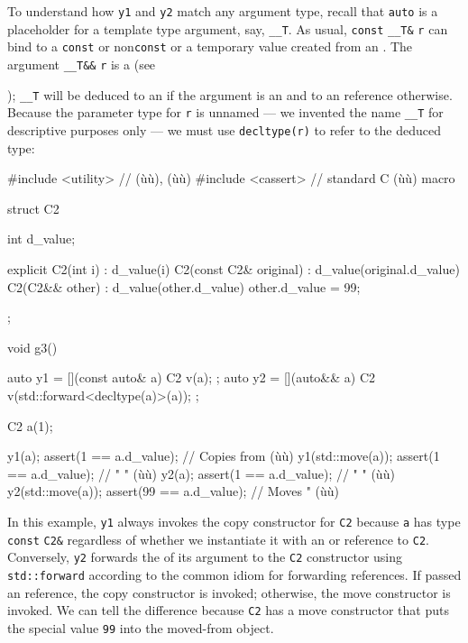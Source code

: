 \noindent To understand how \lstinline!y1! and \lstinline!y2! match any argument type,
recall that \lstinline!auto! is a placeholder for a template type argument,
say, \lstinline!__T!. As usual, \lstinline!const! \lstinline!__T&!
\lstinline!r! can bind to a \lstinline!const! or non\lstinline!const!
 or a temporary value created from an . The
argument \lstinline!__T&&! \lstinline!r! is a  (see {); \lstinline!__T! will be
deduced to an  if the argument is an  and to
an  reference otherwise. Because the parameter type for
\lstinline!r! is unnamed --- we invented the name \lstinline!__T! for
descriptive purposes only --- we must use \lstinline!decltype(r)! to refer
to the deduced type:

\begin{emcppslisting}
#include <utility>  // (ù{}ù), (ù{}ù)
#include <cassert>  // standard C (ù{}ù) macro

struct C2
{
    int d_value;

    explicit C2(int i)     : d_value(i)                { }
    C2(const C2& original) : d_value(original.d_value) { }
    C2(C2&& other)         : d_value(other.d_value)    { other.d_value = 99; }
};

void g3()
{
    auto y1 = [](const auto& a) { C2 v(a); };
    auto y2 = [](auto&&      a) { C2 v(std::forward<decltype(a)>(a)); };

    C2 a(1);

    y1(a);            assert(1  == a.d_value);  // Copies from (ù{}ù)
    y1(std::move(a)); assert(1  == a.d_value);  //    "     "  (ù{}ù)
    y2(a);            assert(1  == a.d_value);  //    "     "  (ù{}ù)
    y2(std::move(a)); assert(99 == a.d_value);  // Moves    "  (ù{}ù)
}
\end{emcppslisting}
    

\noindent In this example, \lstinline!y1! always invokes the copy constructor for
\lstinline!C2! because \lstinline!a! has type \lstinline!const! \lstinline!C2&!
regardless of whether we instantiate it with an  or
 reference to \lstinline!C2!. Conversely, \lstinline!y2! forwards
the  of its argument to the \lstinline!C2!
constructor using \lstinline!std::forward! according to the common idiom
for forwarding references. If passed an  reference, the
copy constructor is invoked; otherwise, the move constructor is invoked.
We can tell the difference because \lstinline!C2! has a move constructor
that puts the special value \lstinline!99! into the moved-from object.

}
